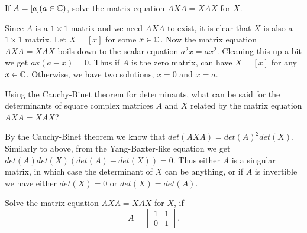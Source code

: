 \documentclass{article}
\begin{document}
\begin{problem}
  If $A = [a] (a \in \mathbb{C})$, solve the matrix equation $A X A = X A X$ for $X$.
\end{problem}

\begin{solution}
  Since $A$ is a $1 \times 1$ matrix and we need $A X A$ to exist, it is clear that $X$ is also a $1 \times 1$ matrix.
  Let $X = [x]$ for some $x \in \mathbb{C}$.
  Now the matrix equation $A X A = X A X$ boils down to the scalar equation $a^2 x = a x^2$.
  Cleaning this up a bit we get $a x (a - x) = 0$.
  Thus if $A$ is the zero matrix, can have $X = [x]$ for any $x \in \mathbb{C}$.
  Otherwise, we have two solutions, $x = 0$ and $x = a$.
\end{solution}

\begin{problem}
  Using the Cauchy-Binet theorem for determinants, what can be said for the determinants of square complex matrices $A$ and $X$ related by the matrix equation $A X A = X A X$?
\end{problem}

\begin{solution}
  By the Cauchy-Binet theorem we know that $det(A X A) = det(A)^2 det(X)$.
  Similarly to above, from the Yang-Baxter-like equation we get $det(A) det(X) (det(A) - det(X)) = 0$.
  Thus either $A$ is a singular matrix, in which case the determinant of $X$ can be anything, or if $A$ is invertible we have either $det(X) = 0$ or $det(X) = det(A)$.
\end{solution}

\begin{problem}
  Solve the matrix equation $A X A = X A X$ for $X$, if
  \[A = \begin{bmatrix} 1 & 1\\ 0 & 1 \end{bmatrix}.\]
\end{problem}
\end{document}
